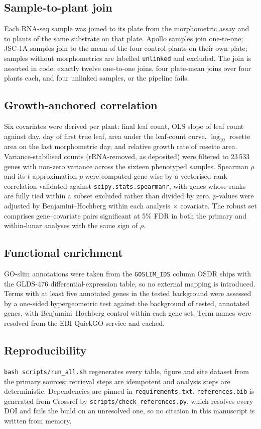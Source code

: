 \documentclass[11pt,a4paper]{article}
\begin{document}
\subsection{Sample-to-plant join}
Each RNA-seq sample was joined to its plate from the morphometric assay and to plants of
the same substrate on that plate. Apollo samples join one-to-one; JSC-1A samples join to
the mean of the four control plants on their own plate; samples without morphometrics are
labelled \texttt{unlinked} and excluded. The join is asserted in code: exactly twelve
one-to-one joins, four plate-mean joins over four plants each, and four unlinked samples,
or the pipeline fails.

\subsection{Growth-anchored correlation}
Six covariates were derived per plant: final leaf count, OLS slope of leaf count against
day, day of first true leaf, area under the leaf-count curve,
$\log_{10}$ rosette area on the last morphometric day, and relative growth rate of
rosette area. Variance-stabilised counts (rRNA-removed, as deposited) were filtered to
23\,533 genes with non-zero variance across the sixteen phenotyped samples. Spearman
$\rho$ and its $t$-approximation $p$ were computed gene-wise by a vectorised rank
correlation validated against \texttt{scipy.stats.spearmanr}, with genes whose ranks are
fully tied within a subset excluded rather than divided by zero. $p$-values were adjusted
by Benjamini--Hochberg \citep{benjamini1995fdr} within each analysis $\times$ covariate.
The robust set comprises gene--covariate pairs significant at 5\% FDR in both the primary
and within-lunar analyses with the same sign of $\rho$.

\subsection{Functional enrichment}
GO-slim annotations were taken from the \texttt{GOSLIM\_IDS} column OSDR ships with the
GLDS-476 differential-expression table, so no external mapping is introduced. Terms with
at least five annotated genes in the tested background were assessed by a one-sided
hypergeometric test against the background of tested, annotated genes, with
Benjamini--Hochberg control within each gene set. Term names were resolved from the EBI
QuickGO service and cached.

\subsection{Reproducibility}
\texttt{bash scripts/run\_all.sh} regenerates every table, figure and site dataset from
the primary sources; retrieval steps are idempotent and analysis steps are deterministic.
Dependencies are pinned in \texttt{requirements.txt}. \texttt{references.bib} is generated
from Crossref by \texttt{scripts/check\_references.py}, which resolves every DOI and fails
the build on an unresolved one, so no citation in this manuscript is written from memory.
\end{document}
